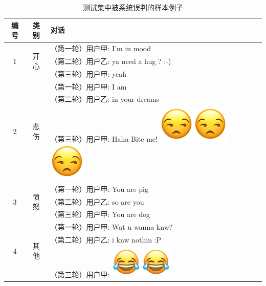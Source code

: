 \begin{table}[]
  \centering
  \begin{minipage}[t]{0.7\linewidth}
  \caption{
    \label{tab:semeval_2019_task3_error}
    测试集中被系统误判的样本例子
  }
  \begin{tabularx}{\linewidth}{c|c|l}
  \toprule[1.5pt]

   编号 & 类别 & 对话    \\
  \hline
  \multirow{3}{*}{1} & \multirow{3}{*}{开心} 
    &   （第一轮）用户甲: I'm in mood \\
    & & （第二轮）用户乙: ya need a hug ? :-) \\
    & & （第三轮）用户甲: yeah \\
  \hline
  \multirow{3}{*}{2} & \multirow{3}{*}{悲伤} 
    &   （第一轮）用户甲: I am \\
    & & （第二轮）用户乙: in your dreams \\
    & & （第三轮）用户甲: Haha Bite me! \includegraphics[height=1.5\fontcharht\font`\B]{img/emoji/speechless.png}\includegraphics[height=1.5\fontcharht\font`\B]{img/emoji/speechless.png}\includegraphics[height=1.5\fontcharht\font`\B]{img/emoji/speechless.png} \\
  \hline
  \multirow{3}{*}{3} & \multirow{3}{*}{愤怒} 
    &   （第一轮）用户甲: You are pig \\
    & & （第二轮）用户乙: so are you \\
    & & （第三轮）用户甲: You are dog \\
  \hline
  \multirow{3}{*}{4} & \multirow{3}{*}{其他} 
    &   （第一轮）用户甲: Wat u wanna knw? \\
    & & （第二轮）用户乙: i knw nothin :P \\
    & & （第三轮）用户甲: \includegraphics[height=1.5\fontcharht\font`\B]{img/emoji/lol.png}\includegraphics[height=1.5\fontcharht\font`\B]{img/emoji/lol.png} \\

\end{tabularx}
\end{minipage}
\end{table}

